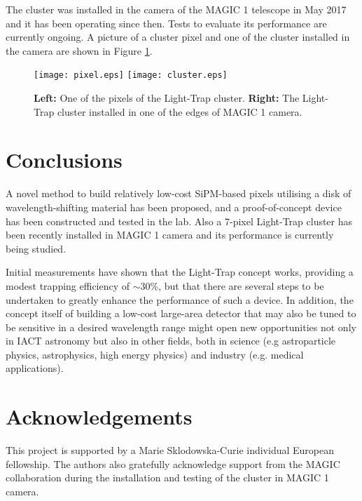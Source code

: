 \documentclass{PoS}
\begin{document}
The cluster was installed in the camera of the MAGIC 1 telescope\cite{upgrade1} in May 2017 and it has been operating since then. Tests to evaluate its performance are currently ongoing. A picture of a cluster pixel and one of the cluster installed in the camera are shown in Figure \ref{fig:cluster}.

\begin{figure}[t]
\centering
\texttt{[image: pixel.eps]}
\texttt{[image: cluster.eps]}
\caption{\textbf{Left:} One of the pixels of the Light-Trap cluster. \textbf{Right:} The Light-Trap cluster installed in one of the edges of MAGIC 1 camera.}\label{fig:cluster}
\end{figure}

\section{Conclusions}

A novel method to build relatively low-cost SiPM-based pixels utilising a disk of wavelength-shifting material has been proposed, and a proof-of-concept device has been constructed and tested in the lab. Also a 7-pixel Light-Trap cluster has been recently installed in MAGIC 1 camera and its performance is currently being studied.

Initial measurements have shown that the Light-Trap concept works, providing a modest trapping efficiency of $\sim$30\%, but that there are several steps to be undertaken to greatly enhance the performance of such a device. In addition, the concept itself of building a low-cost large-area detector that may also be tuned to be sensitive in a desired wavelength range might open new opportunities not only in IACT astronomy but also in other fields, both in science (e.g astroparticle physics, astrophysics, high energy physics) and industry (e.g. medical applications).

\section*{Acknowledgements}

This project is supported by a Marie Sklodowska-Curie individual European fellowship. The authors also gratefully acknowledge support from the MAGIC collaboration during the installation and testing of the cluster in MAGIC 1 camera.
\end{document}
